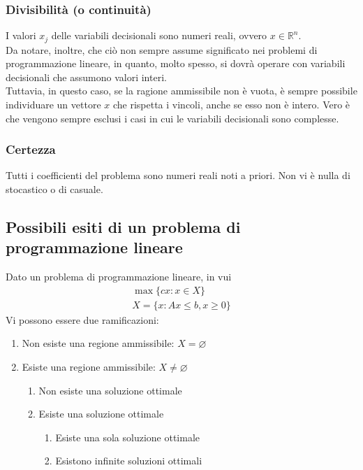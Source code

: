 \documentclass[a4paper]{extarticle}
\begin{document}
\vspace{1em}
\subsubsection{Divisibilità (o continuità)}
I valori $x_j$ delle variabili decisionali sono numeri reali, ovvero $x \in \mathbb{R}^n$.\\
Da notare, inoltre, che ciò non sempre assume significato nei problemi di programmazione lineare, in quanto, molto spesso, si dovrà operare con variabili decisionali che assumono valori interi.\\
Tuttavia, in questo caso, se la ragione ammissibile non è vuota, è sempre possibile individuare un vettore $x$ che rispetta i vincoli, anche se esso non è intero. Vero è che vengono sempre esclusi i casi in cui le variabili decisionali sono complesse.  

\vspace{1em}
\subsubsection{Certezza}
Tutti i coefficienti del problema sono numeri reali noti a priori. Non vi è nulla di stocastico o di casuale.

\vspace{1em}
\subsection{Possibili esiti di un problema di programmazione lineare}
Dato un problema di programmazione lineare, in vui
\begin{align*}
    \max \{c x : x \in X\}\\
    X = \{x : Ax \leq b, x \geq 0\}
\end{align*}
Vi possono essere due ramificazioni:
\begin{enumerate}
    \item Non esiste una regione ammissibile: $X=\varnothing$
    \item Esiste una regione ammissibile: $X \neq \varnothing$
    \begin{enumerate}
        \item Non esiste una soluzione ottimale
        \item Esiste una soluzione ottimale
        \begin{enumerate}
            \item Esiste una sola soluzione ottimale
            \item Esistono infinite soluzioni ottimali
        \end{enumerate}
    \end{enumerate}
\end{enumerate}
\end{document}
